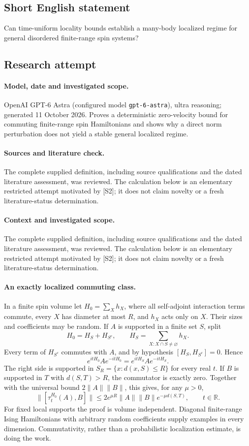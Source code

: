 \documentclass[11pt]{article}
\begin{document}
\subsection{Short English statement}
Can time-uniform locality bounds establish a many-body localized regime for general disordered finite-range spin systems?
\subsection{Research attempt}
\paragraph{Model, date and investigated scope.}
OpenAI GPT-6 Astra (configured model \texttt{gpt-6-astra}), ultra reasoning; generated 11 October 2026. Proves a deterministic zero-velocity bound for commuting finite-range spin Hamiltonians and shows why a direct norm perturbation does not yield a stable general localized regime.

\paragraph{Sources and literature check.}
The complete supplied definition, including source qualifications and the dated literature assessment, was reviewed. The calculation below is an elementary restricted attempt motivated by [S2]; it does not claim novelty or a fresh literature-status determination.

\paragraph{Context and investigated scope.} The complete supplied definition, including source qualifications and the dated literature assessment, was reviewed. The calculation below is an elementary restricted attempt motivated by [S2]; it does not claim novelty or a fresh literature-status determination.

\paragraph{An exactly localized commuting class.}
In a finite spin volume let $H_0=\sum_X h_X$, where all self-adjoint interaction terms commute, every $X$ has diameter at most $R$, and $h_X$ acts only on $X$. Their sizes and coefficients may be random. If $A$ is supported in a finite set $S$, split
\[
 H_0=H_S+H_{S^c},\qquad
 H_S=\sum_{X:X\cap S\ne\varnothing}h_X.
\]
Every term of $H_{S^c}$ commutes with $A$, and by hypothesis $[H_S,H_{S^c}]=0$. Hence
\[
 e^{itH_0}Ae^{-itH_0}=e^{itH_S}Ae^{-itH_S}.
\]
The right side is supported in $S_R=\{x:d(x,S)\leq R\}$ for every real $t$. If $B$ is supported in $T$ with $d(S,T)>R$, the commutator is exactly zero. Together with the universal bound $2\|A\|\|B\|$, this gives, for any $\mu>0$,
\[
 \|[\tau_t^{H_0}(A),B]\|
 \leq 2e^{\mu R}\|A\|\|B\|e^{-\mu d(S,T)},
 \qquad t\in\mathbb R.
\]
For fixed local supports the proof is volume independent. Diagonal finite-range Ising Hamiltonians with arbitrary random coefficients supply examples in every dimension. Commutativity, rather than a probabilistic localization estimate, is doing the work.
\end{document}
